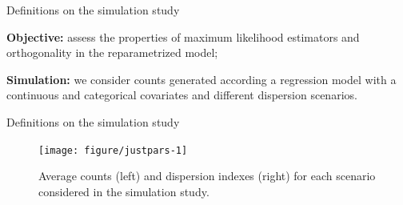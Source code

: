 \documentclass[11pt]{beamer}\usepackage[]{graphicx}\usepackage[]{color}
\begin{document}
\begin{frame}{Definitions on the simulation study}
  \small \vspace{-0.2cm}

  \textbf{Objective:} assess the properties of maximum likelihood
  estimators and orthogonality in the reparametrized model;
  \vspace{0.1cm}

  \textbf{Simulation:} we consider counts generated according a
  regression model with a continuous and categorical covariates and
  different dispersion scenarios.
  \vspace{-0.1cm}

  \begin{center}
  \begin{minipage}{0.9\textwidth}
  \begin{algorithm}[H]
    \footnotesize
    \caption{Steps in simulation study.}
  \end{algorithm}
  \end{minipage}
  \end{center}
\end{frame}

\begin{frame}{Definitions on the simulation study}

\begin{figure}[!htb]

{\centering \texttt{[image: figure/justpars-1]} 

}

\caption[Average counts (left) and dispersion indexes (right) for each scenario considered in the simulation study]{Average counts (left) and dispersion indexes (right) for each scenario considered in the simulation study.}\label{fig:justpars}
\end{figure}



\end{frame}
\end{document}
